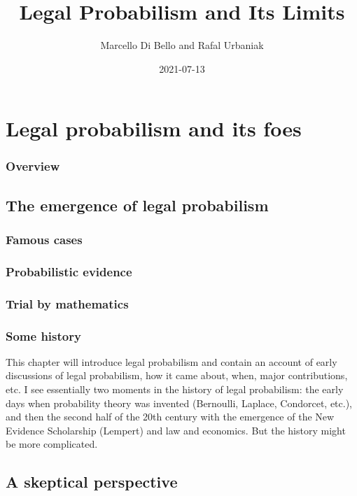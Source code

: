 \documentclass[]{book}
\title{Legal Probabilism and Its Limits}
\author{Marcello Di Bello and Rafal Urbaniak}
\date{2021-07-13}
\begin{document}
\maketitle

{
\setcounter{tocdepth}{1}
\tableofcontents
}
\part{Legal probabilism and its foes}

\section*{Overview}

\chapter{The emergence of legal probabilism}

\section{Famous cases}

\section{Probabilistic evidence}

\section{Trial by mathematics}

\section{Some history}

This chapter will introduce legal probabilism and contain an account of
early\\
discussions of legal probabilism, how it came about, when, major
contributions, etc. I see essentially two moments in the history of
legal probabilism: the early days when probability theory was invented
(Bernoulli, Laplace, Condorcet, etc.), and then the second half of the
20th century with the emergence of the New Evidence Scholarship
(Lempert) and law and economics. But the history might be more
complicated.

\chapter{A skeptical perspective}
\end{document}
